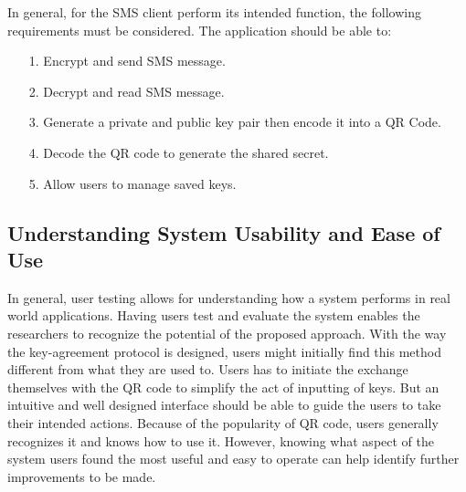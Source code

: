 \documentclass[journal]{./IEEE/IEEEtran}
\begin{document}
In general, for the SMS client perform its intended function, the following
requirements must be considered. The application should be able to:
\begin{itemize}
	\item[1.] Encrypt and send SMS message.
	\item[2.] Decrypt and read SMS message.
	\item[3.] Generate a private and public key pair then encode it into a
		QR Code.
	\item[4.] Decode the QR code to generate the shared secret.
	\item[5.] Allow users to manage saved keys.
\end{itemize}

\subsection{Understanding System Usability and Ease of Use}
In general, user testing allows for understanding how a system performs in
real world applications. Having users test and evaluate the system enables
the researchers to recognize the potential of the proposed approach.
With the way the key-agreement protocol is designed, users might initially
find this method different from what they are used to. Users has to initiate
the exchange themselves with the QR code to simplify the act of inputting of
keys. But an intuitive and well designed interface should be able to guide
the users to take their intended actions. Because of the popularity of QR code,
users generally recognizes it and knows how to use it. However, knowing what
aspect of the system users found the most useful and
easy to operate can help identify further improvements to be made.


%





\end{document}
